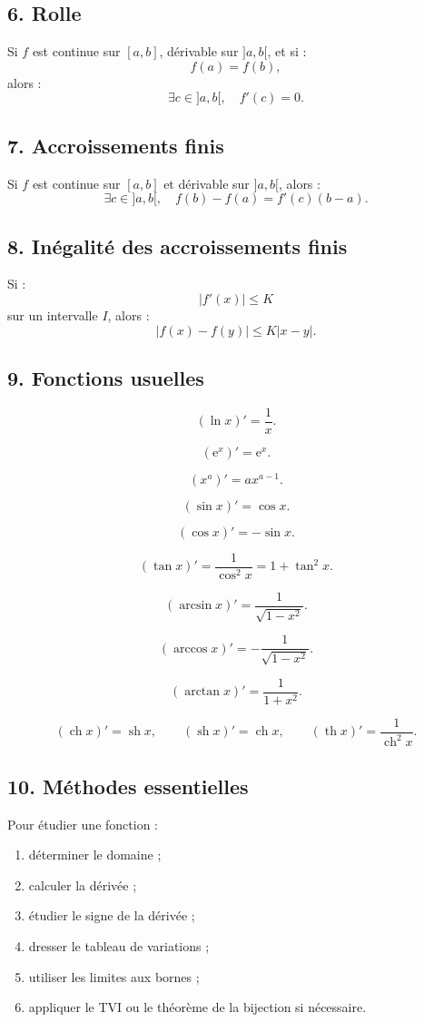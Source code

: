 \documentclass[11pt,a4paper]{article}
\newcommand{\e}{\mathrm e}
\newcommand{\ch}{\operatorname{ch}}
\newcommand{\sh}{\operatorname{sh}}
\renewcommand{\th}{\operatorname{th}}
\begin{document}
\subsection*{6. Rolle}

Si \(f\) est continue sur \([a,b]\), dérivable sur \(]a,b[\), et si :
\[
f(a)=f(b),
\]
alors :
\[
\exists c\in]a,b[,\quad f'(c)=0.
\]

\subsection*{7. Accroissements finis}

Si \(f\) est continue sur \([a,b]\) et dérivable sur \(]a,b[\), alors :
\[
\exists c\in]a,b[,\quad
f(b)-f(a)=f'(c)(b-a).
\]

\subsection*{8. Inégalité des accroissements finis}

Si :
\[
|f'(x)|\leq K
\]
sur un intervalle \(I\), alors :
\[
|f(x)-f(y)|\leq K|x-y|.
\]

\subsection*{9. Fonctions usuelles}

\[
(\ln x)'=\frac1x.
\]

\[
(\e^x)'=\e^x.
\]

\[
(x^a)'=ax^{a-1}.
\]

\[
(\sin x)'=\cos x.
\]

\[
(\cos x)'=-\sin x.
\]

\[
(\tan x)'=\frac1{\cos^2 x}=1+\tan^2 x.
\]

\[
(\arcsin x)'=\frac1{\sqrt{1-x^2}}.
\]

\[
(\arccos x)'=-\frac1{\sqrt{1-x^2}}.
\]

\[
(\arctan x)'=\frac1{1+x^2}.
\]

\[
(\ch x)'=\sh x,
\qquad
(\sh x)'=\ch x,
\qquad
(\th x)'=\frac1{\ch^2 x}.
\]

\subsection*{10. Méthodes essentielles}

Pour étudier une fonction :
\begin{enumerate}
    \item déterminer le domaine ;
    \item calculer la dérivée ;
    \item étudier le signe de la dérivée ;
    \item dresser le tableau de variations ;
    \item utiliser les limites aux bornes ;
    \item appliquer le TVI ou le théorème de la bijection si nécessaire.
\end{enumerate}
\end{document}
